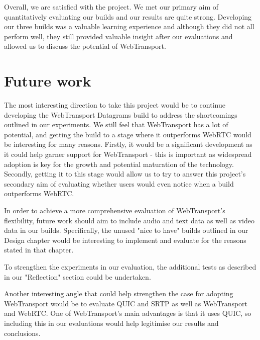 Overall, we are satisfied with the project. We met our primary aim of quantitatively evaluating our builds and our results are quite strong. Developing our three builds was a valuable learning experience and although they did not all perform well, they still provided valuable insight after our evaluations and allowed us to discuss the potential of WebTransport.

\section{Future work}
The most interesting direction to take this project would be to continue developing the WebTransport Datagrams build to address the shortcomings outlined in our experiments. We still feel that WebTransport has a lot of potential, and getting the build to a stage where it outperforms WebRTC would be interesting for many reasons. Firstly, it would be a significant development as it could help garner support for WebTransport - this is important as widespread adoption is key for the growth and potential maturation of the technology. Secondly, getting it to this stage would allow us to try to answer this project's secondary aim of evaluating whether users would even notice when a build outperforms WebRTC.

In order to achieve a more comprehensive evaluation of WebTransport's flexibility, future work should aim to include audio and text data as well as video data in our builds. Specifically, the unused "nice to have" builds outlined in our Design chapter would be interesting to implement and evaluate for the reasons stated in that chapter.

To strengthen the experiments in our evaluation, the additional tests as described in our "Reflection" section could be undertaken.

Another interesting angle that could help strengthen the case for adopting WebTransport would be to evaluate QUIC and SRTP as well as WebTransport and WebRTC. One of WebTransport's main advantages is that it uses QUIC, so including this in our evaluations would help legitimise our results and conclusions.


%
% 